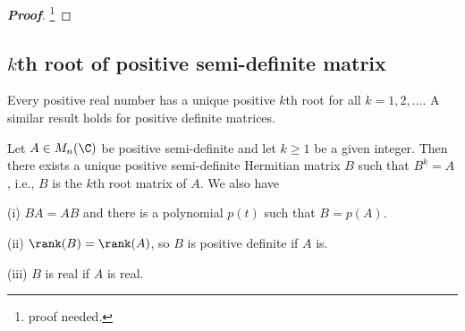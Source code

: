 \begin{proof}[\bf Proof]
\footnote{proof needed.}
\end{proof}






\subsection{$k$th root of positive semi-definite matrix}

Every positive real number has a unique positive $k$th root for all $k=1,2,\dots$. A similar result holds for positive definite matrices.

\begin{theorem}\label{thm:existence_uniqueness_kth_root_matrix_of_positive_semi-definite_matrix}
Let $A\in M_n(\C)$ be positive semi-definite and let $k\geq 1$ be a given integer. Then there exists a unique positive semi-definite Hermitian matrix $B$ such that $B^k = A$, i.e., $B$ is the $k$th
root matrix of $A$. We also have
\ben
\item [(i)] $BA = AB$ and there is a polynomial $p(t)$ such that $B = p(A)$.
\item [(ii)] $\rank(B) = \rank(A)$, so $B$ is positive definite if $A$ is.
\item [(iii)] $B$ is real if $A$ is real.
\een
\end{theorem}

